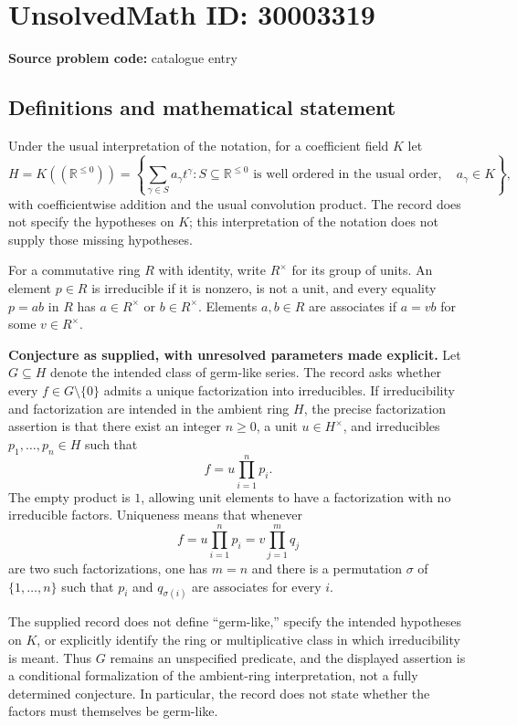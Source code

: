 \documentclass[11pt]{article}
\newcommand{\R}{\mathbb{R}}
\begin{document}
\section*{UnsolvedMath ID: 30003319}
\textbf{Source problem code:} catalogue entry
\subsection{Definitions and mathematical statement}
Under the usual interpretation of the notation, for a coefficient field \(K\) let
\[
H=K((\R^{\leq 0}))
 =\left\{\sum_{\gamma\in S}a_\gamma t^\gamma:
 S\subseteq\R^{\leq0}\text{ is well ordered in the usual order},\quad a_\gamma\in K\right\},
\]
with coefficientwise addition and the usual convolution product. The record does not specify the hypotheses on \(K\); this interpretation of the notation does not supply those missing hypotheses.

For a commutative ring \(R\) with identity, write \(R^\times\) for its group of units. An element \(p\in R\) is irreducible if it is nonzero, is not a unit, and every equality \(p=ab\) in \(R\) has \(a\in R^\times\) or \(b\in R^\times\). Elements \(a,b\in R\) are associates if \(a=vb\) for some \(v\in R^\times\).

\textbf{Conjecture as supplied, with unresolved parameters made explicit.} Let \(G\subseteq H\) denote the intended class of germ-like series. The record asks whether every \(f\in G\setminus\{0\}\) admits a unique factorization into irreducibles. If irreducibility and factorization are intended in the ambient ring \(H\), the precise factorization assertion is that there exist an integer \(n\geq0\), a unit \(u\in H^\times\), and irreducibles \(p_1,\ldots,p_n\in H\) such that
\[
f=u\prod_{i=1}^{n}p_i.
\]
The empty product is \(1\), allowing unit elements to have a factorization with no irreducible factors. Uniqueness means that whenever
\[
f=u\prod_{i=1}^{n}p_i=v\prod_{j=1}^{m}q_j
\]
are two such factorizations, one has \(m=n\) and there is a permutation \(\sigma\) of \(\{1,\ldots,n\}\) such that \(p_i\) and \(q_{\sigma(i)}\) are associates for every \(i\).

The supplied record does not define ``germ-like,'' specify the intended hypotheses on \(K\), or explicitly identify the ring or multiplicative class in which irreducibility is meant. Thus \(G\) remains an unspecified predicate, and the displayed assertion is a conditional formalization of the ambient-ring interpretation, not a fully determined conjecture. In particular, the record does not state whether the factors must themselves be germ-like.
\end{document}
